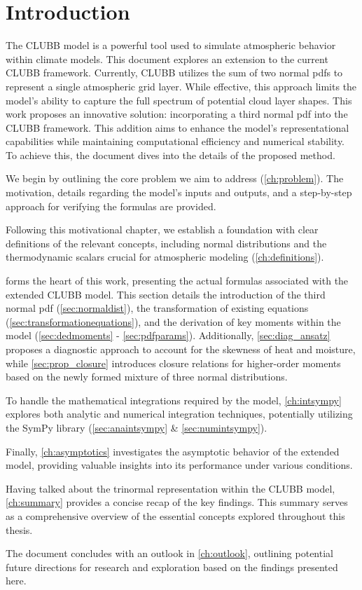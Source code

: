 \chapter{Introduction}\label{ch:introduction}

The \gls{CLUBB} model is a powerful tool used to simulate atmospheric behavior within climate models.
This document explores an extension to the current \gls{CLUBB} framework.
Currently, \gls{CLUBB} utilizes the sum of two normal \glspl{pdf}
to represent a single atmospheric grid layer.
While effective,
this approach limits the model's ability to capture the full spectrum of potential cloud layer shapes.
This work proposes an innovative solution:
incorporating a third normal \gls{pdf} into the \gls{CLUBB} framework.
This addition aims to enhance the model's representational capabilities
while maintaining computational efficiency and numerical stability.
To achieve this, the document dives into the details of the proposed method.

We begin by outlining the core problem we aim to address (\cref{ch:problem}).
The motivation, details regarding the model's inputs and outputs,
and a step-by-step approach for verifying the formulas are provided.

Following this motivational chapter,
we establish a foundation with clear definitions of the relevant concepts,
including normal distributions and the thermodynamic scalars
crucial for atmospheric modeling (\cref{ch:definitions}).

 forms the heart of this work,
presenting the actual formulas associated with the extended \gls{CLUBB} model.
This section details the introduction of the third normal \gls{pdf} (\cref{sec:normaldist}),
the transformation of existing equations (\cref{sec:transformationequations}),
and the derivation of key moments within the model (\cref{sec:dedmoments} - \cref{sec:pdfparams}).
Additionally,
\cref{sec:diag_ansatz} proposes a diagnostic approach
to account for the skewness of heat and moisture,
while \cref{sec:prop_closure} introduces closure relations
for higher-order moments based on the newly formed mixture of three normal distributions.

To handle the mathematical integrations required by the model,
\cref{ch:intsympy} explores both analytic and numerical integration techniques,
potentially utilizing the SymPy library (\cref{sec:anaintsympy} \& \cref{sec:numintsympy}).

Finally,
\cref{ch:asymptotics} investigates the asymptotic behavior of the extended model,
providing valuable insights into its performance under various conditions.

Having talked about the trinormal representation within the \gls{CLUBB} model,
\cref{ch:summary} provides a concise recap of the key findings.
This summary serves as a comprehensive overview of the essential concepts
explored throughout this thesis.

The document concludes with an outlook in \cref{ch:outlook},
outlining potential future directions for research
and exploration based on the findings presented here.

